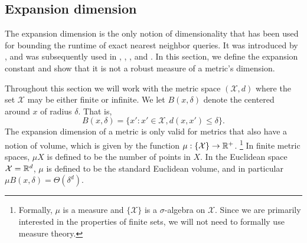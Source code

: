 \documentclass[thesis.tex]{subfiles}
\newcommand{\set}[1]{\mathcal {#1}}
\newcommand{\dist}[2]{\distf({#1},{#2})}
\newcommand{\distf}{d}
\begin{document}

\subsection{Expansion dimension}

The expansion dimension is the only notion of dimensionality that has been used for bounding the runtime of exact nearest neighbor queries.
It was introduced by
\citet{karger2002finding},
and was subsequently used in
\citet{krauthgamer2004navigating},
\citet{beygelzimer2006cover},
\citet{ram2009linear},
and \citet{curtin2015plug}.
In this section, we define the expansion constant and show that it is not a robust measure of a metric's dimension.

Throughout this section we will work with the metric space $(\set X,d)$
where the set $\set X$ may be either finite or infinite.
We let $B(x,\delta)$ denote the  centered around $x$ of radius $\delta$. 
That is,
\begin{equation}
    B(x,\delta) = \{ x' : x'\in\set X, \dist{x}{x'} \le \delta \}.
\end{equation}
The expansion dimension of a metric is only valid for metrics that also have a notion of volume,
which is given by the function $\mu : \{\set X\} \to \R^+$.%
\footnote{
    Formally, $\mu$ is a measure and $\{\set X\}$ is a $\sigma$-algebra on $\set X$.
    Since we are primarily interested in the properties of finite sets,
    we will not need to formally use measure theory.
}
In finite metric spaces, $\mu X$ is defined to be the number of points in $X$.
In the Euclidean space $\set X=\R^d$, $\mu$ is defined to be the standard Euclidean volume,
and in particular $\mu B(x,\delta) = \Theta(\delta^d)$.
\end{document}
